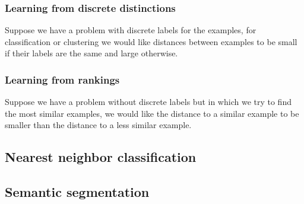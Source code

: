 \documentclass[a4paper,titlepage]{article}
\begin{document}
\subsubsection{Learning from discrete distinctions}

Suppose we have a problem with discrete labels for the examples, for classification or clustering we would like distances between examples to be small if their labels are the same and large otherwise.



\subsubsection{Learning from rankings}

Suppose we have a problem without discrete labels but in which we try to find the most similar examples, we would like the distance to a similar example to be smaller than the distance to a less similar example.

\subsection{Nearest neighbor classification}

\subsection{Semantic segmentation}





%
\end{document}
